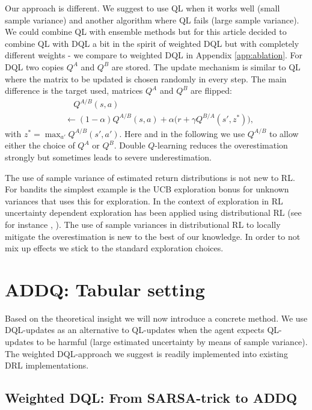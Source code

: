 \documentclass{article}
\theoremstyle{plain}
\theoremstyle{definition}
\theoremstyle{remark}
\begin{document}
Our approach is different. We suggest to use QL when it works well (small sample variance) and another algorithm where QL fails (large sample variance). We could combine QL with ensemble methods but for this article decided to combine QL with DQL a bit in the spirit of weighted DQL \cite{weightedDoubleQ} but with completely different weights - we compare to weighted DQL in Appendix \ref{app:ablation}. 
For DQL \cite{hasselt2010} two copies $Q^A$ and $Q^B$ are stored. The update mechanism is similar to QL where the matrix to be updated is chosen randomly in every step. The main difference is the target used, matrices $Q^A$ and $Q^B$ are flipped:
\begin{align*}
     &\quad Q^{A/B}(s,a)\\
   & \leftarrow(1-\alpha)Q^{A/B}(s,a)+\alpha\big(r+\gamma  Q^{B/A}(s',z^*)\big),
\end{align*}
with $z^*=\max_{a'} Q^{A/B}(s',a')$. Here and in the following we use  $Q^{A/B}$ to allow either the choice of $Q^A$ or $Q^B$. Double $Q$-learning reduces the overestimation strongly but sometimes leads to severe underestimation.


The use of sample variance of estimated return distributions is not new to RL. For bandits the simplest example is the UCB exploration bonus for unknown variances that uses this for exploration. In the context of exploration in RL uncertainty dependent exploration has been applied using distributional RL (see for instance \cite{DRL_exploration}, \cite{DRL_exploration2}). The use of sample variances in distributional RL to locally mitigate the overestimation is new to the best of our knowledge. In order to not mix up effects we stick to the standard exploration choices.





\section{ADDQ: Tabular setting}
Based on the theoretical insight we will now introduce a concrete method. We use DQL-updates as an alternative to QL-updates when the agent expects QL-updates to be harmful (large estimated uncertainty by means of sample variance). The weighted DQL-approach we suggest is readily implemented into existing DRL implementations.


\subsection{Weighted DQL: From SARSA-trick to ADDQ}\label{sec:SARSA}
\end{document}
